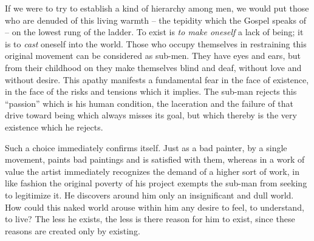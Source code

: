 \documentclass[11pt]{article}
\begin{document}
If we were to try to establish a kind of hierarchy among men, we would put those who are denuded of this living warmth – the tepidity which the Gospel speaks of – on the lowest rung of the ladder. To exist is \textit{to make oneself} a lack of being; it is to \textit{cast} oneself into the world. Those who occupy themselves in restraining this original movement can be considered as sub-men. They have eyes and ears, but from their childhood on they make themselves blind and deaf, without love and without desire. This apathy manifests a fundamental fear in the face of existence, in the face of the risks and tensions which it implies. The sub-man rejects this “passion” which is his human condition, the laceration and the failure of that drive toward being which always misses its goal, but which thereby is the very existence which he rejects.

Such a choice immediately confirms itself. Just as a bad painter, by a single movement, paints bad paintings and is satisfied with them, whereas in a work of value the artist immediately recognizes the demand of a higher sort of work, in like fashion the original poverty of his project exempts the sub-man from seeking to legitimize it. He discovers around him only an insignificant and dull world. How could this naked world arouse within him any desire to feel, to understand, to live? The less he exists, the less is there reason for him to exist, since these reasons are created only by existing.
\end{document}
